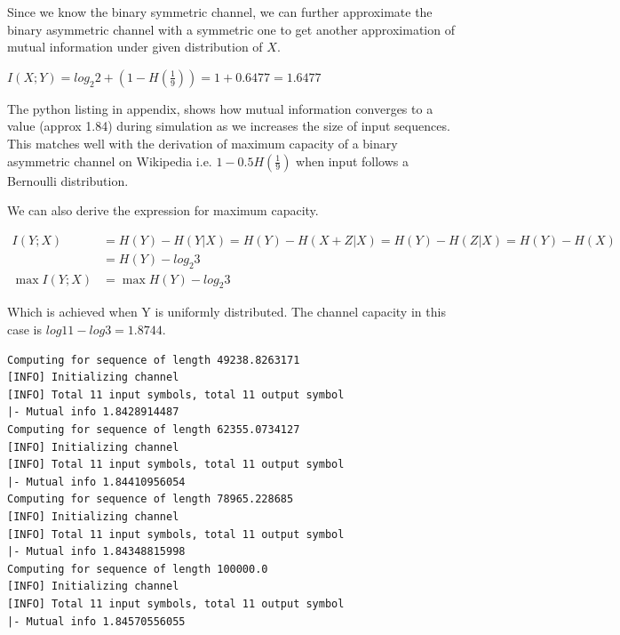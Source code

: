 \documentclass{article}
\begin{document}
Since we know the binary symmetric channel, we can further approximate the
binary asymmetric channel with a symmetric one to get another approximation of
mutual information under given distribution of $X$.

$ I(X; Y) = log_2 {2} + (1 - H(\frac{1}{9})) = 1 + 0.6477 = 1.6477 $

The python listing in appendix, shows how mutual information converges to a
value (approx 1.84) during simulation as we increases the size of input
sequences. This matches well with the derivation of maximum capacity of a binary
asymmetric channel on Wikipedia i.e. $1 - 0.5 H(\frac{1}{9})$ when input follows
a Bernoulli distribution.

We can also derive the expression for maximum capacity.

\begin{align}
I(Y;X) &= H(Y) - H(Y|X) = H(Y) - H(X+Z|X) = H(Y) - H(Z|X) = H(Y) - H(X) \\
    &= H(Y) - log_2 3 \\
\max I(Y; X) &= \max H(Y) - log_2 3
\end{align}

Which is achieved when Y is uniformly distributed. The channel capacity in this
case is $log 11 - log 3 = 1.8744$.



\begin{verbatim}
Computing for sequence of length 49238.8263171 
[INFO] Initializing channel
[INFO] Total 11 input symbols, total 11 output symbol
|- Mutual info 1.8428914487
Computing for sequence of length 62355.0734127 
[INFO] Initializing channel
[INFO] Total 11 input symbols, total 11 output symbol
|- Mutual info 1.84410956054
Computing for sequence of length 78965.228685 
[INFO] Initializing channel
[INFO] Total 11 input symbols, total 11 output symbol
|- Mutual info 1.84348815998
Computing for sequence of length 100000.0 
[INFO] Initializing channel
[INFO] Total 11 input symbols, total 11 output symbol
|- Mutual info 1.84570556055
\end{verbatim}

\end{document}
